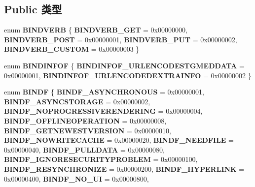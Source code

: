 \subsection*{Public 类型}
\begin{DoxyCompactItemize}
\item 
\mbox{\label{interface_i_bind_status_callback_a86945e231aaa31b27fa4c910b3897ea5}} 
enum {\bfseries B\+I\+N\+D\+V\+E\+RB} \{ {\bfseries B\+I\+N\+D\+V\+E\+R\+B\+\_\+\+G\+ET} = 0x00000000, 
{\bfseries B\+I\+N\+D\+V\+E\+R\+B\+\_\+\+P\+O\+ST} = 0x00000001, 
{\bfseries B\+I\+N\+D\+V\+E\+R\+B\+\_\+\+P\+UT} = 0x00000002, 
{\bfseries B\+I\+N\+D\+V\+E\+R\+B\+\_\+\+C\+U\+S\+T\+OM} = 0x00000003
 \}
\item 
\mbox{\label{interface_i_bind_status_callback_a1021b3a4136cbd8c86376094a7f1b6f4}} 
enum {\bfseries B\+I\+N\+D\+I\+N\+F\+OF} \{ {\bfseries B\+I\+N\+D\+I\+N\+F\+O\+F\+\_\+\+U\+R\+L\+E\+N\+C\+O\+D\+E\+S\+T\+G\+M\+E\+D\+D\+A\+TA} = 0x00000001, 
{\bfseries B\+I\+N\+D\+I\+N\+F\+O\+F\+\_\+\+U\+R\+L\+E\+N\+C\+O\+D\+E\+D\+E\+X\+T\+R\+A\+I\+N\+FO} = 0x00000002
 \}
\item 
\mbox{\label{interface_i_bind_status_callback_a962df365240749243e7b8dbfa4015f68}} 
enum {\bfseries B\+I\+N\+DF} \{ \newline
{\bfseries B\+I\+N\+D\+F\+\_\+\+A\+S\+Y\+N\+C\+H\+R\+O\+N\+O\+US} = 0x00000001, 
{\bfseries B\+I\+N\+D\+F\+\_\+\+A\+S\+Y\+N\+C\+S\+T\+O\+R\+A\+GE} = 0x00000002, 
{\bfseries B\+I\+N\+D\+F\+\_\+\+N\+O\+P\+R\+O\+G\+R\+E\+S\+S\+I\+V\+E\+R\+E\+N\+D\+E\+R\+I\+NG} = 0x00000004, 
{\bfseries B\+I\+N\+D\+F\+\_\+\+O\+F\+F\+L\+I\+N\+E\+O\+P\+E\+R\+A\+T\+I\+ON} = 0x00000008, 
\newline
{\bfseries B\+I\+N\+D\+F\+\_\+\+G\+E\+T\+N\+E\+W\+E\+S\+T\+V\+E\+R\+S\+I\+ON} = 0x00000010, 
{\bfseries B\+I\+N\+D\+F\+\_\+\+N\+O\+W\+R\+I\+T\+E\+C\+A\+C\+HE} = 0x00000020, 
{\bfseries B\+I\+N\+D\+F\+\_\+\+N\+E\+E\+D\+F\+I\+LE} = 0x00000040, 
{\bfseries B\+I\+N\+D\+F\+\_\+\+P\+U\+L\+L\+D\+A\+TA} = 0x00000080, 
\newline
{\bfseries B\+I\+N\+D\+F\+\_\+\+I\+G\+N\+O\+R\+E\+S\+E\+C\+U\+R\+I\+T\+Y\+P\+R\+O\+B\+L\+EM} = 0x00000100, 
{\bfseries B\+I\+N\+D\+F\+\_\+\+R\+E\+S\+Y\+N\+C\+H\+R\+O\+N\+I\+ZE} = 0x00000200, 
{\bfseries B\+I\+N\+D\+F\+\_\+\+H\+Y\+P\+E\+R\+L\+I\+NK} = 0x00000400, 
{\bfseries B\+I\+N\+D\+F\+\_\+\+N\+O\+\_\+\+UI} = 0x00000800, 

\end{DoxyCompactItemize}
